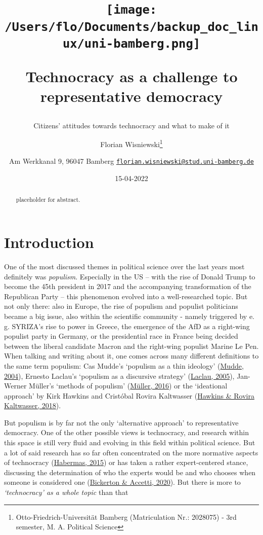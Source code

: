 \documentclass[
  12pt,
  english,
]{article}
\title{\texttt{[image: /Users/flo/Documents/backup\_doc\_linux/uni-bamberg.png]}

Technocracy as a challenge to representative democracy}
\subtitle{Citizens' attitudes towards technocracy and what to make of
it}
\author{Florian Wisniewski\footnote{Otto-Friedrich-Universität Bamberg
  (Matriculation Nr.: 2028075) - 3rd semester, M. A. Political Science} \and Am
Werkkanal 9, 96047 Bamberg \textbar{}
\href{mailto:florian.wisniewski@stud.uni-bamberg.de}{\nolinkurl{florian.wisniewski@stud.uni-bamberg.de}}}
\date{15-04-2022}
\begin{document}
\maketitle
\begin{abstract}
placeholder for abstract.
\end{abstract}

\newpage{}

\tableofcontents

\newpage{}

\hypertarget{introduction}{%
\section{Introduction}\label{introduction}}

One of the most discussed themes in political science over the last
years most definitely was \emph{populism}. Especially in the US -- with
the rise of Donald Trump to become the 45th president in 2017 and the
accompanying transformation of the Republican Party -- this phenomenon
evolved into a well-researched topic. But not only there: also in
Europe, the rise of populism and populist politicians became a big
issue, also within the scientific community - namely triggered by e. g.
SYRIZA's rise to power in Greece, the emergence of the AfD as a
right-wing populist party in Germany, or the presidential race in France
being decided between the liberal candidate Macron and the right-wing
populist Marine Le Pen. When talking and writing about it, one comes
across many different definitions to the same term populism: Cas Mudde's
`populism as a thin ideology'
(\protect\hyperlink{ref-mudde2004populist}{Mudde, 2004}), Ernesto
Laclau's `populism as a discursive strategy'
(\protect\hyperlink{ref-laclau2005populist}{Laclau, 2005}), Jan-Werner
Müller's `methods of populism'
(\protect\hyperlink{ref-muxfcller2016populismus}{Müller, 2016}) or the
`ideational approach' by Kirk Hawkins and Cristóbal Rovira Kaltwasser
(\protect\hyperlink{ref-hawkins2018ideational}{Hawkins \& Rovira
Kaltwasser, 2018}).

But populism is by far not the only `alternative approach' to
representative democracy. One of the other possible views is
technocracy, and research within this space is still very fluid and
evolving in this field within political science. But a lot of said
research has so far often concentrated on the more normative aspects of
technocracy (\protect\hyperlink{ref-habermas2015lure}{Habermas, 2015})
or has taken a rather expert-centered stance, discussing the
determination of who the experts would be and who chooses when someone
is considered one
(\protect\hyperlink{ref-bickerton2020technocracy}{Bickerton \& Accetti,
2020}). But there is more to \emph{`technocracy' as a whole topic} than
that
\end{document}
